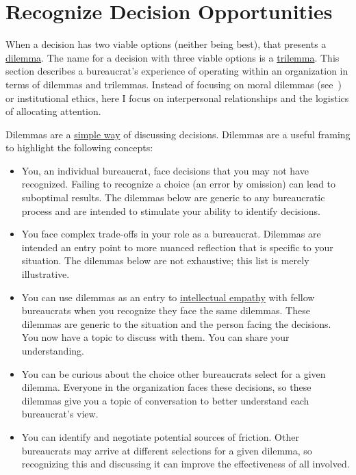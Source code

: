 \section{Recognize Decision Opportunities\label{sec:dilemma-trilemma}}



When a decision has two viable options (neither being best), that presents a \href{https://en.wikipedia.org/wiki/Dilemma}{dilemma}. The name for a decision with three viable options is a \href{https://en.wikipedia.org/wiki/Trilemma}{trilemma}. This section describes a bureaucrat's experience of operating within an organization in terms of dilemmas and trilemmas. Instead of focusing on moral dilemmas (see~\cite{2017_Zacka}) or institutional ethics, here I focus on interpersonal relationships and the logistics of allocating attention. 

Dilemmas are a \href{https://en.wikipedia.org/wiki/Defeasible_reasoning}{simple way} of discussing decisions. %
Dilemmas are a useful framing to highlight the following concepts:
\begin{itemize}
    \item You, an individual bureaucrat, face decisions that you may not have recognized. Failing to recognize a choice (an error by omission) can lead to suboptimal results. The dilemmas below are generic to any bureaucratic process and are intended to stimulate your ability to identify decisions. 
    \item You face complex trade-offs in your role as a bureaucrat. Dilemmas are intended an entry point to more nuanced reflection that is specific to your situation. The dilemmas below are not exhaustive; this list is merely illustrative. 
    \item You can use dilemmas as an entry to \href{https://en.wikipedia.org/wiki/Theory_of_mind}{intellectual empathy} with fellow bureaucrats when you recognize they face the same dilemmas. These dilemmas are generic to the situation and the person facing the decisions. You now have a topic to discuss with them. You can share your understanding. 
    \item You can be curious about the choice other bureaucrats select for a given dilemma. Everyone in the organization faces these decisions, so these dilemmas give you a topic of conversation to better understand each bureaucrat's view.
    \item You can identify and negotiate potential sources of friction. Other bureaucrats may arrive at different selections for a given dilemma, so recognizing this and discussing it can improve the effectiveness of all involved.
\end{itemize}


